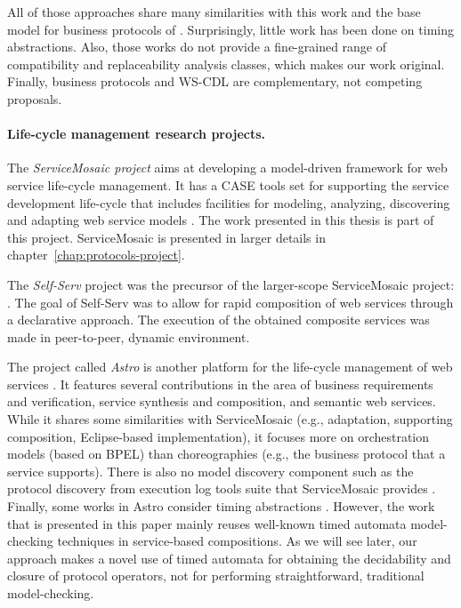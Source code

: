 All of those approaches share many similarities with this work and the base model for business protocols of \cite{FTBB}. Surprisingly, little work has been done on timing abstractions. Also, those works do not provide a fine-grained range of compatibility and replaceability analysis classes, which makes our work original. Finally, business protocols and WS-CDL are complementary, not competing proposals.

\paragraph{Life-cycle management research projects.}
The \emph{ServiceMosaic project} \cite{BCTPM06-SM} aims at developing a model-driven framework for web service life-cycle management. It has a CASE tools set for supporting the service development life-cycle that includes facilities for modeling, analyzing, discovering and adapting web service models \cite{BCTPM06-SM,NezhadSBCPT07}. The work presented in this thesis is part of this project. ServiceMosaic is presented in larger details in chapter~\ref{chap:protocols-project}.

The \emph{Self-Serv} project was the precursor of the larger-scope ServiceMosaic project: \cite{ShengBDM02,BenatallahDM02,BenatallahSD03}. The goal of Self-Serv was to allow for rapid composition of web services through a declarative approach. The execution of the obtained composite services was made in peer-to-peer, dynamic environment.

The project called \emph{Astro} is another platform for the life-cycle management of web services \cite{TrainottiPCZLBBT05}. It features several contributions in the area of business requirements and verification, service synthesis and composition, and semantic web services. While it shares some similarities with ServiceMosaic (e.g., adaptation, supporting composition, Eclipse-based implementation), it focuses more on orchestration models (based on BPEL) than choreographies (e.g., the business protocol that a service supports). There is also no model discovery component such as the protocol discovery from execution log tools suite that ServiceMosaic provides \cite{Motahari-NezhadSBC07}. Finally, some works in Astro consider timing abstractions \cite{KazhamiakinPP06}. However, the work that is presented in this paper mainly reuses well-known timed automata model-checking techniques in service-based compositions. As we will see later, our approach makes a novel use of timed automata for obtaining the decidability and closure of protocol operators, not for performing straightforward, traditional model-checking. \\

